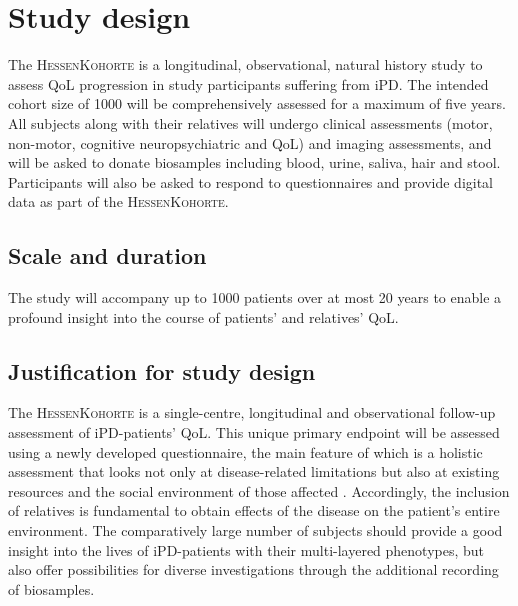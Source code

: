 
\section{Study design}
The \textsc{HessenKohorte} is a longitudinal, observational, natural history study to assess \ac{QoL} progression in study participants suffering from \ac{iPD}. The intended cohort size of \num[round-precision = 0, round-mode = places]{1000}{} will be comprehensively assessed for a maximum of five years. All subjects along with their relatives will undergo clinical assessments (motor, non-motor, cognitive neuropsychiatric and \ac{QoL}) and imaging assessments, and will be asked to donate biosamples including blood, urine, saliva, hair and stool. Participants will also be asked to respond to questionnaires and provide digital data as part of the \textsc{HessenKohorte}.

\subsection{Scale and duration}
The study will accompany up to \num[round-precision = 0, round-mode = places]{1000}{} patients over at most 20 years to enable a profound insight into the course of patients' and relatives' \ac{QoL}.

\subsection{Justification for study design}
The \textsc{HessenKohorte} is a single-centre, longitudinal and observational follow-up assessment of \ac{iPD}-patients' \ac{QoL}. This unique primary endpoint will be assessed using a newly developed questionnaire, the main feature of which is a holistic assessment that looks not only at disease-related limitations but also at existing resources and the social environment of those affected \cite{thieken2022jpd}. Accordingly, the inclusion of relatives is fundamental to obtain effects of the disease on the patient's entire environment. The comparatively large number of subjects should provide a good insight into the lives of \ac{iPD}-patients with their multi-layered phenotypes, but also offer possibilities for diverse investigations through the additional recording of biosamples.


